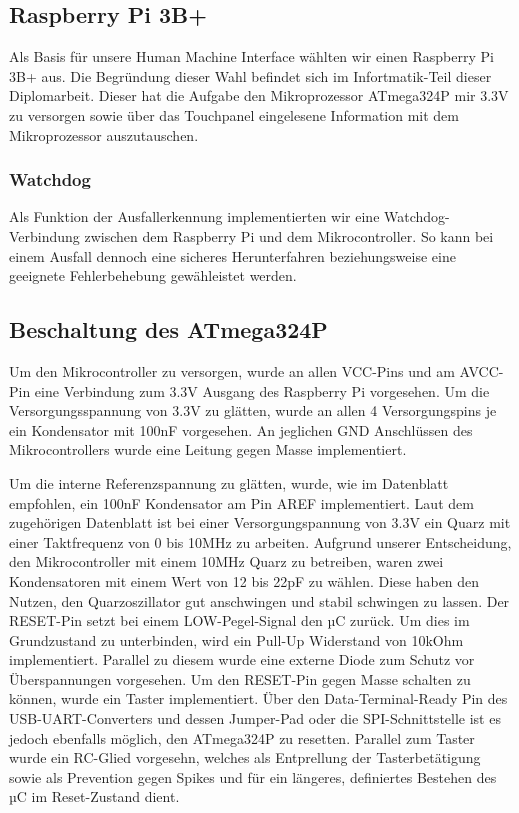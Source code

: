 \subsection{Raspberry Pi 3B+}

Als Basis für unsere Human Machine Interface wählten wir einen Raspberry Pi 3B+ aus.
Die Begründung dieser Wahl befindet sich im Infortmatik-Teil dieser Diplomarbeit.
Dieser hat die Aufgabe den Mikroprozessor ATmega324P mir 3.3V zu versorgen sowie über das Touchpanel eingelesene Information mit dem Mikroprozessor auszutauschen.

\subsubsection{Watchdog}

Als Funktion der Ausfallerkennung implementierten wir eine Watchdog-Verbindung zwischen dem Raspberry Pi und dem Mikrocontroller.
So kann bei einem Ausfall dennoch eine sicheres Herunterfahren beziehungsweise eine geeignete Fehlerbehebung gewähleistet werden.

\subsection{Beschaltung des ATmega324P}

Um den Mikrocontroller zu versorgen, wurde an allen VCC-Pins und am AVCC-Pin eine Verbindung zum 3.3V Ausgang des Raspberry Pi vorgesehen.
Um die Versorgungsspannung von 3.3V zu glätten, wurde an allen 4 Versorgungspins je ein Kondensator mit 100nF vorgesehen.
An jeglichen GND Anschlüssen des Mikrocontrollers wurde eine Leitung gegen Masse implementiert.

Um die interne Referenzspannung zu glätten, wurde, wie im Datenblatt empfohlen, ein 100nF Kondensator am Pin AREF implementiert.
Laut dem zugehörigen Datenblatt ist bei einer Versorgungspannung von 3.3V ein Quarz mit einer Taktfrequenz von 0 bis 10MHz zu arbeiten.
Aufgrund unserer Entscheidung, den Mikrocontroller mit einem 10MHz Quarz zu betreiben, waren zwei Kondensatoren mit einem Wert von 12 bis 22pF zu wählen.
Diese haben den Nutzen, den Quarzoszillator gut anschwingen und stabil schwingen zu lassen.
Der RESET-Pin setzt bei einem LOW-Pegel-Signal den µC zurück.
Um dies im Grundzustand zu unterbinden, wird ein Pull-Up Widerstand von 10kOhm implementiert.
Parallel zu diesem wurde eine externe Diode zum Schutz vor Überspannungen vorgesehen.
Um den RESET-Pin gegen Masse schalten zu können, wurde ein Taster implementiert.
Über den Data-Terminal-Ready Pin des USB-UART-Converters und dessen Jumper-Pad oder die SPI-Schnittstelle ist es jedoch ebenfalls möglich, den ATmega324P zu resetten.
Parallel zum Taster wurde ein RC-Glied vorgesehn, welches als Entprellung der Tasterbetätigung sowie als Prevention gegen Spikes und für ein längeres, definiertes Bestehen des µC im Reset-Zustand dient.

